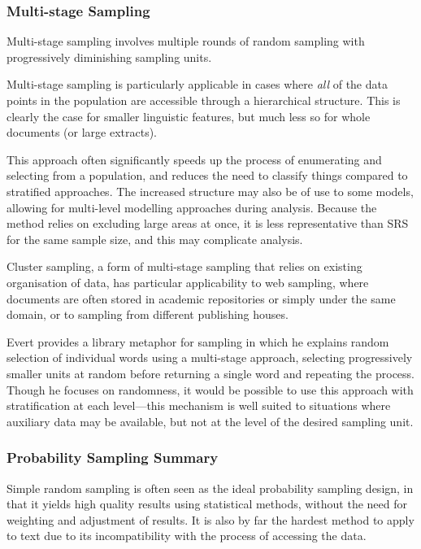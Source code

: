 \subsubsection{Multi-stage Sampling}
Multi-stage sampling involves multiple rounds of random sampling with progressively diminishing sampling units.

Multi-stage sampling is particularly applicable in cases where \textsl{all} of the data points in the population are accessible through a hierarchical structure.  This is clearly the case for smaller linguistic features, but much less so for whole documents (or large extracts).

This approach often significantly speeds up the process of enumerating and selecting from a population, and reduces the need to classify things compared to stratified approaches.  The increased structure may also be of use to some models, allowing for multi-level modelling approaches during analysis.  Because the method relies on excluding large areas at once, it is less representative than SRS for the same sample size, and this may complicate analysis.

Cluster sampling, a form of multi-stage sampling that relies on existing organisation of data, has particular applicability to web sampling, where documents are often stored in academic repositories or simply under the same domain, or to sampling from different publishing houses.

Evert provides a library metaphor for sampling in which he explains random selection of individual words using a multi-stage approach\cite{evert2006random}, selecting progressively smaller units at random before returning a single word and repeating the process.  Though he focuses on randomness, it would be possible to use this approach with stratification at each level---this mechanism is well suited to situations where auxiliary data may be available, but not at the level of the desired sampling unit.

\subsubsection{Probability Sampling Summary}
Simple random sampling is often seen as the ideal probability sampling design, in that it yields high quality results using statistical methods, without the need for weighting and adjustment of results.  It is also by far the hardest method to apply to text due to its incompatibility with the process of accessing the data.


